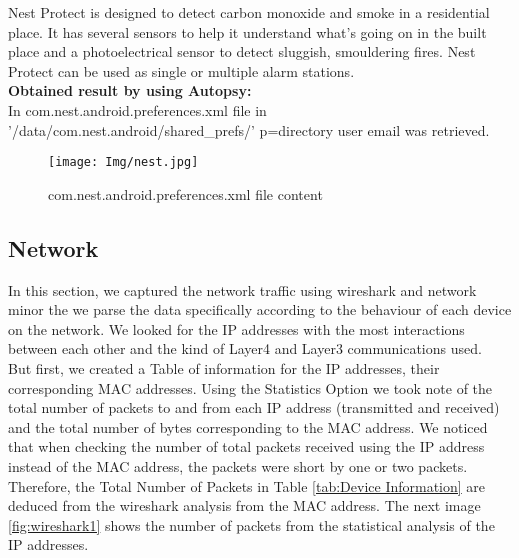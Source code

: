 \documentclass{easychair}
\begin{document}
Nest Protect is designed to detect carbon monoxide and smoke in a residential place.  It has several sensors to help it understand what's going on in the built place and a photoelectrical sensor to detect sluggish, smouldering fires. Nest Protect can be used as single or multiple alarm stations\cite{pari_11}.\\

\textbf{Obtained result by using Autopsy:}\\
In com.nest.android.preferences.xml file in '/data/com.nest.android/shared\_prefs/' p=directory user email was retrieved.\\

\begin{figure}[H]
    \centering
    \texttt{[image: Img/nest.jpg]}
    \caption{com.nest.android.preferences.xml file content}
    \label{fig:my_label}
\end{figure}

\subsection{Network}
In this section, we captured the network traffic using wireshark and network minor the we parse the data specifically according to the behaviour of each device on the network. We looked for the IP addresses with the most interactions between each other and the kind of Layer4 and Layer3 communications used. 
\\
But first, we created a Table of information for the IP addresses, their corresponding MAC addresses. Using the Statistics Option  we took note of the total number of packets to and from each IP address (transmitted and received) and the total number of bytes corresponding to the MAC address.
We noticed that when checking the number of total packets received using the IP address instead of the MAC address, the packets were short by one or two packets. Therefore, the Total Number of Packets in Table \ref{tab:Device Information} are deduced from the wireshark analysis from the MAC address. The next image \ref{fig:wireshark1} shows the number of packets from the statistical analysis of the IP addresses. 
\end{document}

